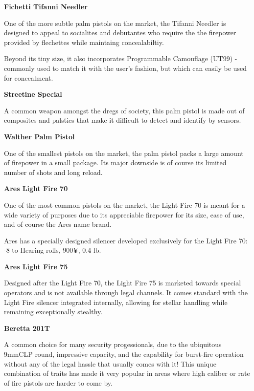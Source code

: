 \begin{mdframed}[linewidth=0pt]
	\begin{multicols}{2}
		
		\textbf{Fichetti Tifanni Needler}
		
		One of the more subtle palm pistols on the market, the Tifanni Needler is designed to appeal to socialites and debutantes who require the the firepower provided by flechettes while maintaing concealabiltiy.
		
		Beyond its tiny size, it also incorporates Programmable Camouflage (UT99) - commonly used to match it with the user's fashion, but which can easily be used for concealment.
		
		\textbf{Streetine Special}

		A common weapon amongst the dregs of society, this palm pistol is made out of composites and palstics that make it difficult to detect and identify by sensors.
		
		\textbf{Walther Palm Pistol}
		
		One of the smallest pistols on the market, the palm pistol packs a large amount of firepower in a small package. Its major downside is of course its limited number of shots and long reload.
		
		\textbf{Ares Light Fire 70}
		
		One of the most common pistols on the market, the Light Fire 70 is meant for a wide variety of purposes due to its appreciable firepower for its size, ease of use, and of course the Ares name brand.
		
		Ares has a specially designed silencer developed exclusively for the Light Fire 70: -8 to Hearing rolls, 900¥, 0.4 lb.
		
		\textbf{Ares Light Fire 75}
		
		Designed after the Light Fire 70, the Light Fire 75 is marketed towards special operators and is not available through legal channels. It comes standard with the Light Fire silencer integrated internally, allowing for stellar handling while remaining exceptionally stealthy.
		
		\textbf{Beretta 201T}
		
		A common choice for many security progessionals, due to the ubiquitous 9mmCLP round, impressive capacity, and the capability for burst-fire operation without any of the legal hassle that usually comes with it! This unique combination of traits has made it very popular in areas where high caliber or rate of fire pistols are harder to come by.
		

\end{multicols}
\end{mdframed}
